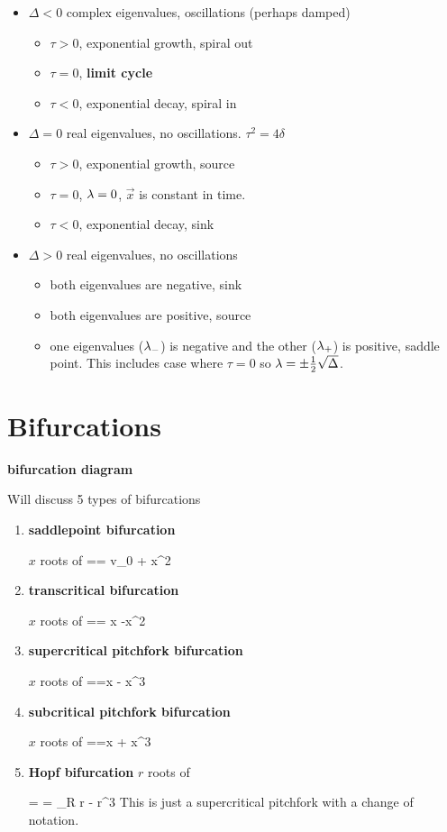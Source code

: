 \begin{itemize}
\item $\Delta < 0$
complex eigenvalues,
oscillations (perhaps damped)
\begin{itemize}[\checkmark]
\item $\tau>0$, exponential growth, spiral out
\item $\tau=0$, {\bf limit cycle}
\item $\tau<0$, exponential decay, spiral in
\end{itemize}


\item $\Delta = 0$
real eigenvalues,
no oscillations. $\tau^2 = 4\delta$
\begin{itemize}[\checkmark]
\item $\tau>0$, exponential growth, source
\item $\tau=0$, $\lambda=0$, $\vec{x}$ is constant in time.
\item $\tau<0$, exponential decay, sink
\end{itemize}

\item $\Delta > 0$
real eigenvalues,
no oscillations 

\begin{itemize}[\checkmark]
\item both eigenvalues are negative, sink
\item both eigenvalues are positive, source
\item one eigenvalues ($\lambda_-$) is negative 
and the other ($\lambda_+$) is positive, saddle point. This 
includes case where $\tau=0$ so $\lambda =\pm\frac{1}{2}\sqrt{\Delta}$.
\end{itemize}
\end{itemize}
\section{Bifurcations}

{\bf bifurcation diagram}

Will  discuss 5 types of bifurcations

\begin{enumerate}
\item {\bf saddlepoint bifurcation}

$x$ roots of
== v_0 + x^2
\eeq

\item{\bf transcritical bifurcation}

$x$ roots of
== \lam x -x^2
\eeq
\item {\bf supercritical pitchfork bifurcation}

$x$  roots of
==\lam x - x^3
\eeq
\item {\bf subcritical pitchfork bifurcation}

$x$ roots of 
==\lam x + x^3
\eeq

\item {\bf Hopf bifurcation}
$r$ roots of

= = \mu_R r - r^3
\eeq
This is just a supercritical pitchfork with a change of notation.

\end{enumerate}





